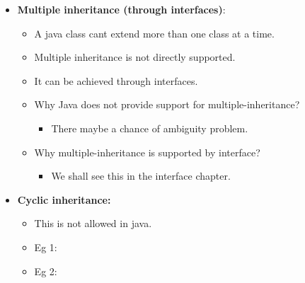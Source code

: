 \begin{flushleft}
\begin{itemize}
		\newpage
		
		\item \textbf{Multiple inheritance (through interfaces)}: 
		\begin{itemize}
			\item A java class cant extend more than one class at a time.
			\item Multiple inheritance is not directly supported.
			\item It can be achieved through interfaces. 
			\bigskip
			\bigskip
			\item Why Java does not provide support for multiple-inheritance?
			\begin{itemize}
				\item There maybe a chance of ambiguity problem. 
			\end{itemize}
		
			\item Why multiple-inheritance is supported by interface?
			\begin{itemize}
				\item We shall see this in the interface chapter.
			\end{itemize}
			
		\end{itemize}
		\newpage
		\item \textbf{Cyclic inheritance:}
		\begin{itemize}
			\item This is not allowed in java. 
			\item Eg 1:
			\bigskip
			\item Eg 2:
			\bigskip
		\end{itemize}	
		
	\end{itemize}
	
\end{flushleft}

\newpage


